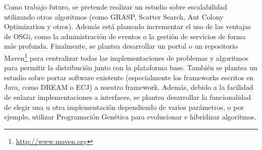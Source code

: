 \documentclass[runningheads]{llncs}
\begin{document}
Como trabajo futuro, se pretende realizar un estudio sobre escalabilidad utilizando otros algoritmos (como GRASP, Scatter Search, Ant Colony Optimization y otros). Además está planeado incrementar el uso de las ventajas de OSGi, como la administración de eventos o la gestión de servicios de forma más profunda. Finalmente, se plantea desarrollar un portal o un repositorio Maven\footnote{\url{http://www.maven.org}} para centralizar todas las implementaciones de problemas y algoritmos para permitir la distribución junto con la plataforma base. También se plantea un estudio sobre portar software existente (especialmente los frameworks escritos en Java, como DREAM o ECJ) a nuestro framework. Además, debido a la facilidad de enlazar implementaciones a interfaces, se plantea desarrollar la funcionalidad de elegir una u otra implementación dependiendo de varios parámetros, o por ejemplo, utilizar Programación Genética para evolucionar e hibridizar algoritmos.





\end{document}
